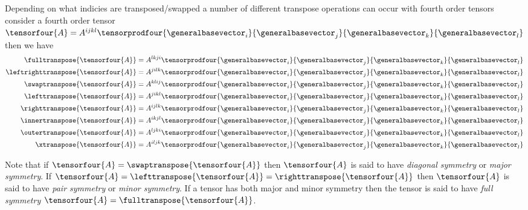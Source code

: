 Depending on what indicies are transposed/swapped a number of different
transpose operations can occur with fourth order tensors \ie consider a fourth
order tensor
$\tensorfour{A}=A^{ijkl}\tensorprodfour{\generalbasevector_{i}}{\generalbasevector_{j}}{\generalbasevector_{k}}{\generalbasevector_{l}}$
then we have
\begin{align}
  \fulltranspose{\tensorfour{A}}&=A^{lkji}\tensorprodfour{\generalbasevector_{i}}{\generalbasevector_{j}}{\generalbasevector_{k}}{\generalbasevector_{l}}\\
  \leftrighttranspose{\tensorfour{A}}&=A^{jilk}\tensorprodfour{\generalbasevector_{i}}{\generalbasevector_{j}}{\generalbasevector_{k}}{\generalbasevector_{l}}\\
  \swaptranspose{\tensorfour{A}}&=A^{klij}\tensorprodfour{\generalbasevector_{i}}{\generalbasevector_{j}}{\generalbasevector_{k}}{\generalbasevector_{l}}\\
  \lefttranspose{\tensorfour{A}}&=A^{jikl}\tensorprodfour{\generalbasevector_{i}}{\generalbasevector_{j}}{\generalbasevector_{k}}{\generalbasevector_{l}}\\
  \righttranspose{\tensorfour{A}}&=A^{ijlk}\tensorprodfour{\generalbasevector_{i}}{\generalbasevector_{j}}{\generalbasevector_{k}}{\generalbasevector_{l}}\\
  \innertranspose{\tensorfour{A}}&=A^{ikjl}\tensorprodfour{\generalbasevector_{i}}{\generalbasevector_{j}}{\generalbasevector_{k}}{\generalbasevector_{l}}\\
  \outertranspose{\tensorfour{A}}&=A^{ljki}\tensorprodfour{\generalbasevector_{i}}{\generalbasevector_{j}}{\generalbasevector_{k}}{\generalbasevector_{l}}\\
  \xtranspose{\tensorfour{A}}&=A^{iljk}\tensorprodfour{\generalbasevector_{i}}{\generalbasevector_{j}}{\generalbasevector_{k}}{\generalbasevector_{l}}
\end{align}

Note that if $\tensorfour{A}=\swaptranspose{\tensorfour{A}}$ then
$\tensorfour{A}$ is said to have \emph{diagonal symmetry} or \emph{major
  symmetry}. If
$\tensorfour{A}=\lefttranspose{\tensorfour{A}}=\righttranspose{\tensorfour{A}}$
then $\tensorfour{A}$ is said to have \emph{pair symmetry} or \emph{minor
  symmetry}. If a tensor has both major and minor symmetry then the tensor is
said to have \emph{full symmetry} \ie
$\tensorfour{A}=\fulltranspose{\tensorfour{A}}$.

